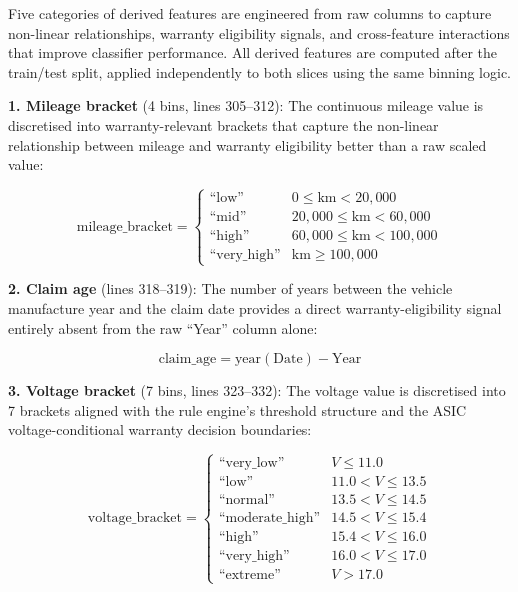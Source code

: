 \documentclass[10pt,a4paper]{article}
\begin{document}
Five categories of derived features are engineered from raw columns to capture non-linear relationships, warranty eligibility signals, and cross-feature interactions that improve classifier performance. All derived features are computed after the train/test split, applied independently to both slices using the same binning logic.

\textbf{1. Mileage bracket} (4 bins, lines 305--312): The continuous mileage value is discretised into warranty-relevant brackets that capture the non-linear relationship between mileage and warranty eligibility better than a raw scaled value:

\begin{equation}
\text{mileage\_bracket} = \begin{cases}
\text{``low''}       & 0 \leq \text{km} < 20{,}000 \\
\text{``mid''}       & 20{,}000 \leq \text{km} < 60{,}000 \\
\text{``high''}      & 60{,}000 \leq \text{km} < 100{,}000 \\
\text{``very\_high''} & \text{km} \geq 100{,}000
\end{cases}
\label{eq:mileage-bracket}
\end{equation}

\textbf{2. Claim age} (lines 318--319): The number of years between the vehicle manufacture year and the claim date provides a direct warranty-eligibility signal entirely absent from the raw ``Year'' column alone:

\begin{equation}
\text{claim\_age} = \text{year}(\text{Date}) - \text{Year}
\label{eq:claim-age}
\end{equation}

\textbf{3. Voltage bracket} (7 bins, lines 323--332): The voltage value is discretised into 7 brackets aligned with the rule engine's threshold structure and the ASIC voltage-conditional warranty decision boundaries:

\begin{equation}
\text{voltage\_bracket} = \begin{cases}
\text{``very\_low''}      & V \leq 11.0 \\
\text{``low''}             & 11.0 < V \leq 13.5 \\
\text{``normal''}          & 13.5 < V \leq 14.5 \\
\text{``moderate\_high''}  & 14.5 < V \leq 15.4 \\
\text{``high''}            & 15.4 < V \leq 16.0 \\
\text{``very\_high''}      & 16.0 < V \leq 17.0 \\
\text{``extreme''}         & V > 17.0
\end{cases}
\label{eq:voltage-bracket}
\end{equation}
\end{document}
